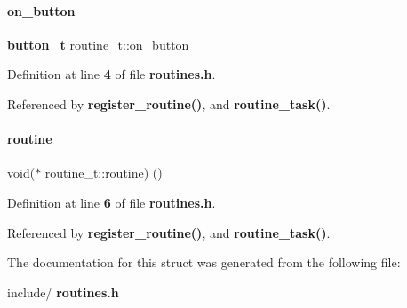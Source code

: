 \paragraph{on\+\_\+button}
{\footnotesize\ttfamily \textbf{ button\+\_\+t} routine\+\_\+t\+::on\+\_\+button}



Definition at line \textbf{ 4} of file \textbf{ routines.\+h}.



Referenced by \textbf{ register\+\_\+routine()}, and \textbf{ routine\+\_\+task()}.

\mbox{\label{a00191_a016f918d811a58ee2b63a5e48161dcf8}} 
\paragraph{routine}
{\footnotesize\ttfamily void($\ast$ routine\+\_\+t\+::routine) ()}



Definition at line \textbf{ 6} of file \textbf{ routines.\+h}.



Referenced by \textbf{ register\+\_\+routine()}, and \textbf{ routine\+\_\+task()}.



The documentation for this struct was generated from the following file\+:\begin{DoxyCompactItemize}
\item 
include/\textbf{ routines.\+h}\end{DoxyCompactItemize}
